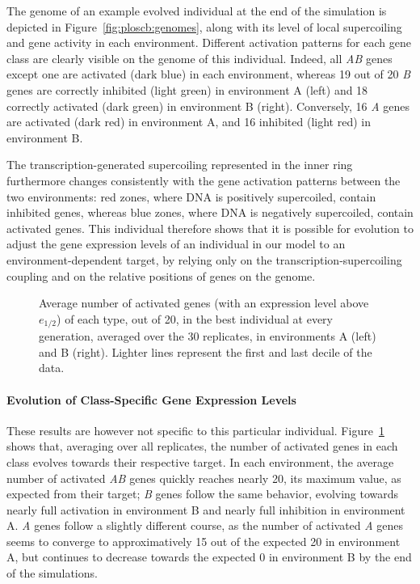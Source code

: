 The genome of an example evolved individual at the end of the simulation is depicted in Figure~\ref{fig:ploscb:genomes}, along with its level of local supercoiling and gene activity in each environment.
Different activation patterns for each gene class are clearly visible on the genome of this individual.
Indeed, all \emph{AB} genes except one are activated (dark blue) in each environment, whereas 19 out of 20 \emph{B} genes are correctly inhibited (light green) in environment A (left) and 18 correctly activated (dark green) in environment B (right).
Conversely, 16 \emph{A} genes are activated (dark red) in environment A, and 16 inhibited (light red) in environment B.

The transcription-generated supercoiling represented in the inner ring furthermore changes consistently with the gene activation patterns between the two environments: red zones, where DNA is positively supercoiled, contain inhibited genes, whereas blue zones, where DNA is negatively supercoiled, contain activated genes.
This individual therefore shows that it is possible for evolution to adjust the gene expression levels of an individual in our model to an environment-dependent target, by relying only on the transcription-supercoiling coupling and on the relative positions of genes on the genome.

\begin{figure}[H]
  \begin{elasticrow}[width=\textwidth]
  \end{elasticrow}
  \caption[Average number of activated genes during evolution in the advanced model]{Average number of activated genes (with an expression level above $e_{1/2}$) of each type, out of 20, in the best individual at every generation, averaged over the 30 replicates, in environments A (left) and B (right).
  Lighter lines represent the first and last decile of the data.}
  \label{fig:ploscb:gene_activity_by_env}
\end{figure}

\paragraph{Evolution of Class-Specific Gene Expression Levels}
These results are however not specific to this particular individual.
Figure~\ref{fig:ploscb:gene_activity_by_env} shows that, averaging over all replicates, the number of activated genes in each class evolves towards their respective target.
In each environment, the average number of activated \emph{AB} genes quickly reaches nearly 20, its maximum value, as expected from their target; \emph{B} genes follow the same behavior, evolving towards nearly full activation in environment B and nearly full inhibition in environment A.
\emph{A} genes follow a slightly different course, as the number of activated \emph{A} genes seems to converge to approximatively 15 out of the expected 20 in environment A, but continues to decrease towards the expected 0 in environment B by the end of the simulations.

